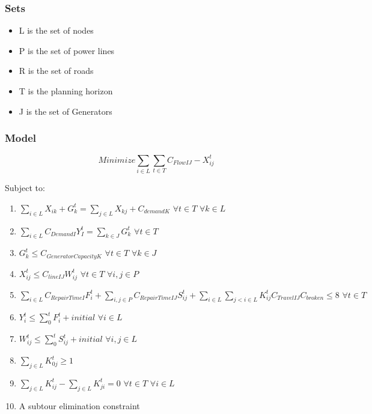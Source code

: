 \documentclass{article}
\begin{document}
	\subsubsection{Sets}
	\begin{itemize}
		\item L is the set of nodes
		\item P is the set of power lines
		\item R is the set of roads
		\item T is the planning horizon
		\item J is the set of Generators
	\end{itemize}
	\subsubsection{Model}
	$$	Minimize \sum_{i \in L} \sum_{t \in T} C_{FlowIJ}-X_{ij}^t $$
	
	Subject to:
	\begin{enumerate}[label=(\arabic*), leftmargin=*, itemsep=0.4ex, before={\everymath{\displaystyle}}]%
		
		\item $\sum_{i \in L} X_{ik}+G_{k}^{t} = \sum_{j \in L} X_{kj}+C_{demandK} \hspace{4pt} \forall t \in T \hspace{4pt} \forall k \in L$ 
		\item $\sum_{i \in L} C_{DemandI}Y_I^t = \sum_{k \in J} G_k^t \hspace{4pt} \forall t \in T$
		\item $G_k^t \leq C_{GeneratorCapacityK} \hspace{4pt} \forall t\in T \hspace{4pt} \forall k \in J$
		\item $X_{ij}^t \leq C_{lineIJ}W_{ij}^t \hspace{4pt} \forall t \in T \hspace{4pt} \forall i,j \in P$
		\item $\sum_{i \in L} C_{RepairTimeI} F_{i}^t +\sum_{i,j \in P} C_{RepairTimeIJ} S_{ij}^t + \sum_{i \in L} \sum_{j<i \in L}  K_{ij}^t C_{TravelIJ} C_{broken} \leq 8 \hspace{4pt} \forall t \in T \hspace{4pt}$
		\item $Y_i^t \leq \sum_{0}^{t} F_i^t+initial \hspace{4pt} \forall i \in L$ 
		\item $W_{ij}^t \leq \sum_{0}^{t} S_{ij}^t+initial \hspace{4pt} \forall i,j \in L $
		\item $\sum_{j \in L} K_{0j}^t \geq 1 $
		\item $\sum_{j \in L}K_{ij}^t - \sum_{j \in L}K_{ji}^t = 0  \hspace{4pt} \forall t \in T \hspace{4pt} \forall i \in L$
		\item A subtour elimination constraint 
	\end{enumerate}
\end{document}
